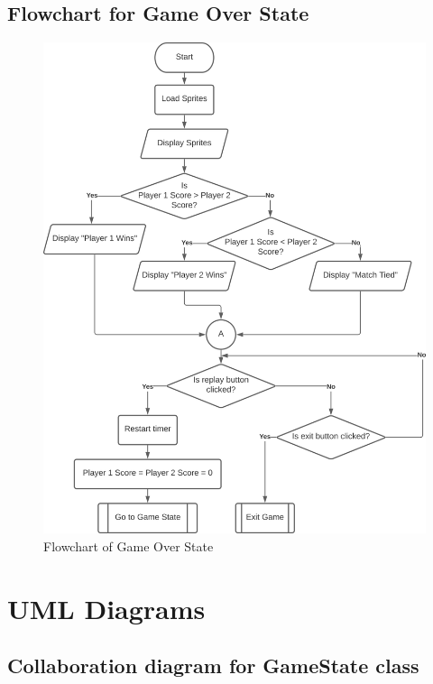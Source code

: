 \documentclass[main]{subfiles}
\begin{document}
    \subsection{Flowchart for Game Over State}
        \begin{figure}[H]
            \centering
            \includegraphics[scale=0.5]{graphics/flowcharts/gameover_state.png}
            \caption{Flowchart of Game Over State}
            \label{fig:GameOverState}
        \end{figure}



\section{UML Diagrams}
    \subsection{Collaboration diagram for GameState class}
\end{document}
